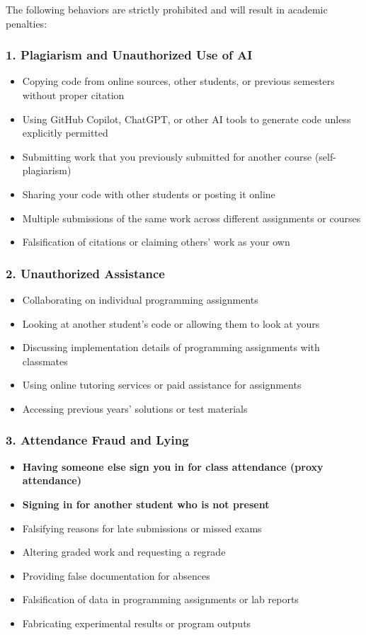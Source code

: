 \documentclass[11pt,letterpaper]{article}
\begin{document}
The following behaviors are strictly prohibited and will result in academic penalties:

\subsubsection*{1. Plagiarism and Unauthorized Use of AI}
\begin{itemize}[leftmargin=1cm]
    \item Copying code from online sources, other students, or previous semesters without proper citation
    \item Using GitHub Copilot, ChatGPT, or other AI tools to generate code unless explicitly permitted
    \item Submitting work that you previously submitted for another course (self-plagiarism)
    \item Sharing your code with other students or posting it online
    \item Multiple submissions of the same work across different assignments or courses
    \item Falsification of citations or claiming others' work as your own
\end{itemize}

\subsubsection*{2. Unauthorized Assistance}
\begin{itemize}[leftmargin=1cm]
    \item Collaborating on individual programming assignments
    \item Looking at another student's code or allowing them to look at yours
    \item Discussing implementation details of programming assignments with classmates
    \item Using online tutoring services or paid assistance for assignments
    \item Accessing previous years' solutions or test materials
\end{itemize}

\subsubsection*{3. Attendance Fraud and Lying}
\begin{itemize}[leftmargin=1cm]
    \item \textbf{Having someone else sign you in for class attendance (proxy attendance)}
    \item \textbf{Signing in for another student who is not present}
    \item Falsifying reasons for late submissions or missed exams
    \item Altering graded work and requesting a regrade
    \item Providing false documentation for absences
    \item Falsification of data in programming assignments or lab reports
    \item Fabricating experimental results or program outputs
\end{itemize}
\end{document}
